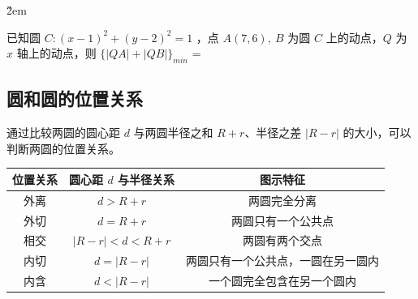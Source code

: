 \v{2em}

\begin{example}
    已知圆 $C:(x-1)^2+(y-2)^2=1$ ，点 $A(7,6), ~ B$ 为圆 $C$ 上的动点，$Q$ 为 $x$ 轴上的动点，则 $\{|Q A|+|Q B|\}_{min}$ = \underline{\qquad}
\end{example}

\vspace{10em}

\pagebreak

\subsection{圆和圆的位置关系}

\begin{theorem}[圆与圆的位置关系]
    通过比较两圆的圆心距 $d$ 与两圆半径之和 $R+r$、半径之差 $|R-r|$ 的大小，可以判断两圆的位置关系。

    \begin{center}
        \begin{tabular}{|c|c|c|}
            \hline
            位置关系 & 圆心距 $d$ 与半径关系         & 图示特征              \\
            \hline
            外离   & $d > R + r$           & 两圆完全分离            \\
            \hline
            外切   & $d = R + r$           & 两圆只有一个公共点         \\
            \hline
            相交   & $|R - r| < d < R + r$ & 两圆有两个交点           \\
            \hline
            内切   & $d = |R - r|$         & 两圆只有一个公共点，一圆在另一圆内 \\
            \hline
            内含   & $d < |R - r|$         & 一个圆完全包含在另一个圆内     \\
            \hline
        \end{tabular}
    \end{center}

    \begin{center}
\end{center}
\end{theorem}
